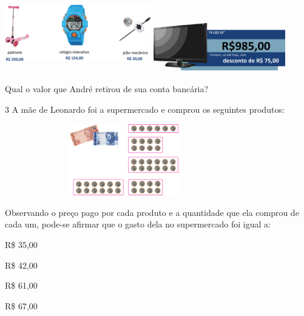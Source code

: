 \begin{multicols}{2}
\includegraphics[width=2.50022in,height=1.34178in]{media/image72.png}
\includegraphics[width=2.26686in,height=0.87508in]{media/image73.png}

Qual o valor que André retirou de sua conta bancária?


\num{3} A mãe de Leonardo foi a supermercado e comprou os seguintes produtos:


\includegraphics[width=4.10036in,height=1.22511in]{media/image74.png}

Observando o preço pago por cada produto e a quantidade que ela comprou de cada um, pode-se afirmar que o gasto dela no supermercado foi igual a:

\begin{minipage}{.5\textwidth}
\begin{escolha}

\item
  R\$ 35,00
\item
  R\$ 42,00
\item
  R\$ 61,00
\item
  R\$ 67,00
\end{escolha}
\end{minipage}


\end{multicols}
